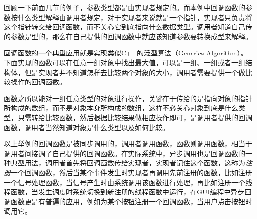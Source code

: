




回顾一下前面几节的例子，参数类型都是由实现者规定的。而本例中回调函数的参数按什么类型解释由调用者规定，对于实现者来说就是一个指针，实现者只负责将这个指针转交给回调函数，而不关心它到底指向什么数据类型。调用者知道自己传的参数是型的，那么在自己提供的回调函数中就应该知道参数要转换成型来解释。



回调函数的一个典型应用就是实现类似C+\BookSplit{}+\BookSplit{}的泛型算法（Generics Algorithm）。下面实现的函数可以在任意一组对象中找出最大值，可以是一组、一组或者一组结构体，但是实现者并不知道怎样去比较两个对象的大小，调用者需要提供一个做比较操作的回调函数。







函数之所以能对一组任意类型的对象进行操作，关键在于传给的是指向对象的指针所构成的数组，而不是对象本身所构成的数组，这样不必关心对象到底是什么类型，只需转给比较函数，然后根据比较结果做相应操作即可，是调用者提供的回调函数，调用者当然知道对象是什么类型以及如何比较。



以上举例的回调函数是被同步调用的，调用者调用函数，函数则调用函数，相当于调用者间接调了自己提供的回调函数。在实际系统中，异步调用也是回调函数的一种典型用法，调用者首先将回调函数传给实现者，实现者记住这个函数，这称为\emph{注册}一个回调函数，然后当某个事件发生时实现者再调用先前注册的函数，比如注册一个信号处理函数，当信号产生时由系统调用该函数进行处理，再比如注册一个线程函数，当发生调度时系统切换到新注册的线程函数中运行，在GUI编程中异步回调函数更是有普遍的应用，例如为某个按钮注册一个回调函数，当用户点击按钮时调用它。



